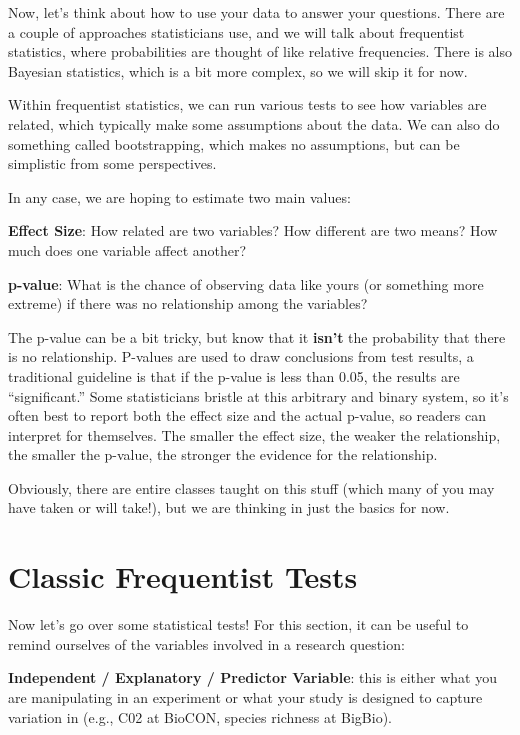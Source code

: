 \documentclass[
  letterpaper,
  DIV=11,
  numbers=noendperiod]{scrreprt}
\begin{document}
Now, let's think about how to use your data to answer your questions.
There are a couple of approaches statisticians use, and we will talk
about frequentist statistics, where probabilities are thought of like
relative frequencies. There is also Bayesian statistics, which is a bit
more complex, so we will skip it for now.

Within frequentist statistics, we can run various tests to see how
variables are related, which typically make some assumptions about the
data. We can also do something called bootstrapping, which makes no
assumptions, but can be simplistic from some perspectives.

In any case, we are hoping to estimate two main values:

\textbf{Effect Size}: How related are two variables? How different are
two means? How much does one variable affect another?

\textbf{p-value}: What is the chance of observing data like yours (or
something more extreme) if there was no relationship among the
variables?

The p-value can be a bit tricky, but know that it \textbf{isn't} the
probability that there is no relationship. P-values are used to draw
conclusions from test results, a traditional guideline is that if the
p-value is less than 0.05, the results are ``significant.'' Some
statisticians bristle at this arbitrary and binary system, so it's often
best to report both the effect size and the actual p-value, so readers
can interpret for themselves. The smaller the effect size, the weaker
the relationship, the smaller the p-value, the stronger the evidence for
the relationship.

Obviously, there are entire classes taught on this stuff (which many of
you may have taken or will take!), but we are thinking in just the
basics for now.

\section{Classic Frequentist Tests}\label{classic-frequentist-tests}

Now let's go over some statistical tests! For this section, it can be
useful to remind ourselves of the variables involved in a research
question:

\textbf{Independent / Explanatory / Predictor Variable}: this is either
what you are manipulating in an experiment or what your study is
designed to capture variation in (e.g., C02 at BioCON, species richness
at BigBio).
\end{document}
